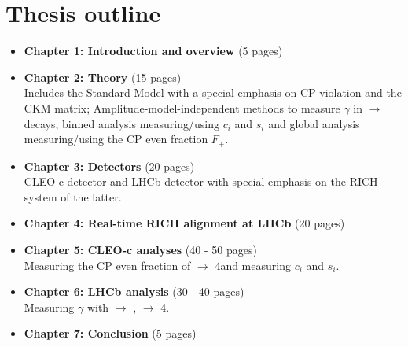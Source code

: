 \section{Thesis outline}
\begin{itemize}
\item \textbf{Chapter 1: Introduction and overview} (5 pages)\\
\item \textbf{Chapter 2: Theory} (15 pages)\\
	Includes the Standard Model with a special emphasis on CP violation and the CKM matrix; Amplitude-model-independent methods to measure $\gamma$ in \B $\rightarrow$ \D \kaon decays, binned analysis measuring/using $c_i$ and $s_i$ and global analysis measuring/using the CP even fraction $F_+$.
\item \textbf{Chapter 3: Detectors} (20 pages)\\
CLEO-c detector and LHCb detector with special emphasis on the RICH system of the latter.\\
\item \textbf{Chapter 4: Real-time RICH alignment at LHCb} (20 pages)\\
\item \textbf{Chapter 5: CLEO-c analyses} (40 - 50 pages)\\
Measuring the CP even fraction of \D $\rightarrow$ 4\pion and measuring $c_i$ and $s_i$.\\
\item \textbf{Chapter 6: LHCb analysis} (30 - 40 pages)\\
Measuring $\gamma$ with \B $\rightarrow$ \D \kaon , \D $\rightarrow$ 4\pion .
\item \textbf{Chapter 7: Conclusion }(5 pages)
\end{itemize}

